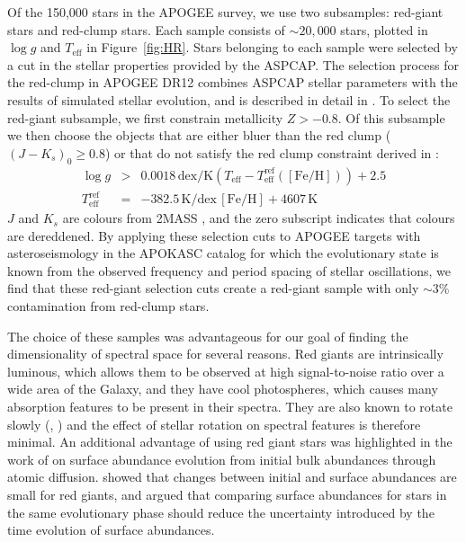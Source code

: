 \documentclass[a4paper,fleqn,usenatbib]{mnras}
\newcommand       \teff     {{T_{\mathrm{eff}}}}
\begin{document}
Of the 150,000 stars in the APOGEE survey, we use two subsamples: red-giant stars and red-clump stars. Each sample consists of $\sim 20,000$ stars, plotted in $\log g$ and $\teff$ in Figure~\ref{fig:HR}. Stars belonging to each sample were selected by a cut in the stellar properties provided by the ASPCAP. The selection process for the red-clump in APOGEE DR12 combines ASPCAP stellar parameters with the results of simulated stellar evolution, and is described in detail in \citet{Bovy2014}. To select the red-giant subsample, we first constrain metallicity $Z > -0.8$. Of this subsample we then choose the objects that are either bluer than the red clump ($(J - K_s)_0 \geq 0.8$) or that do not satisfy the red clump constraint derived in \citet{Bovy2014}:
\begin{eqnarray}
	\log g &>& 0.0018\, \mathrm{dex}/\mathrm{K} \left(T_{\mathrm{eff}} - T_{\mathrm{eff}}^{\mathrm{ref}}([\mathrm{Fe/H}])\right)+2.5	\nonumber\\
	T_{\mathrm{eff}}^{\mathrm{ref}} &=& -382.5\,\mathrm{K}/\mathrm{dex}\, [\mathrm{Fe/H}] + 4607 \, \mathrm{K}
\end{eqnarray}
$J$ and $K_s$ are colours from 2MASS \citep{Skrutskie2006}, and the zero subscript indicates that colours are dereddened. By applying these selection cuts to APOGEE targets with asteroseismology in the APOKASC catalog \citep{Pinsonneault2014} for which the evolutionary state is known from the observed frequency and period spacing of stellar oscillations, we find that these red-giant selection cuts create a red-giant sample with only $\sim 3\%$ contamination from red-clump stars.

The choice of these samples was advantageous for our goal of finding the dimensionality of spectral space for several reasons. Red giants are intrinsically luminous, which allows them to be observed at high signal-to-noise ratio over a wide area of the Galaxy, and they have cool photospheres, which causes many absorption features to be present in their spectra. They are also known to rotate slowly (\citealt{Gray1982}, \citealt{DeMedeirosJ.R.1996}) and the effect of stellar rotation on spectral features is therefore minimal. An additional advantage of using red giant stars was highlighted in the work of \citet{Dotter2017} on surface abundance evolution from initial bulk abundances through atomic diffusion. \citet{Dotter2017} showed that changes between initial and surface abundances are small for red giants, and argued that comparing surface abundances for stars in the same evolutionary phase should reduce the uncertainty introduced by the time evolution of surface abundances. 
\end{document}
